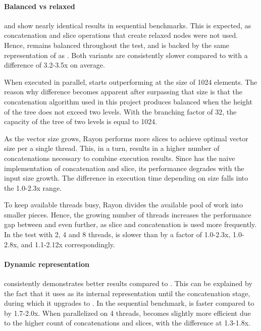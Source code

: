 
\paragraph{Balanced vs relaxed}
\rbvec{} and \rrbvec{} show nearly identical results in sequential benchmarks. This is expected, as concatenation and slice operations that create relaxed nodes were not used. Hence, \rrbvec{} remains balanced throughout the test, and is backed by the same representation of \rrbtree{} as \rbvec{}. Both variants are consistently slower compared to \stdvec{} with a difference of 3.2-3.5x on average.

When executed in parallel, \rrbvec{} starts outperforming \rbvec{} at the size of 1024 elements. The reason why difference becomes apparent after surpassing that size is that the concatenation algorithm used in this project produces balanced \rbtree{} when the height of the tree does not exceed two levels. With the branching factor of 32, the capacity of the tree of two levels is equal to 1024.

As the vector size grows, Rayon performs more slices to achieve optimal vector size per a single thread. This, in a turn, results in a higher number of concatenations necessary to combine execution results. Since \rbvec{} has the naive implementation of concatenation and slice, its performance degrades with the input size growth. The difference in execution time depending on size falls into the 1.0-2.3x range.

To keep available threads busy, Rayon divides the available pool of work into smaller pieces. Hence, the growing number of threads increases the performance gap between \rbvec{} and \rrbvec{} even further, as slice and concatenation is used more frequently. In the test with 2, 4 and 8 threads, \rbvec{} is slower than \rrbvec{} by a factor of 1.0-2.3x, 1.0-2.8x, and 1.1-2.12x correspondingly.

\paragraph{Dynamic representation}
\pvec{} consistently demonstrates better results compared to \rrbvec{}. This can be explained by the fact that it uses \stdvec{} as its internal representation until the concatenation stage, during which it upgrades to \rrbvec{}. In the sequential benchmark, \pvec{} is faster compared to \rrbvec{} by 1.7-2.0x. When parallelized on 4 threads, \rrbvec{} becomes slightly more efficient due to the higher count of concatenations and slices, with the difference at 1.3-1.8x.

